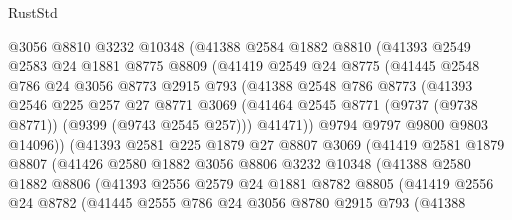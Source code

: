 \begin{lexlean}{RustStd}
\begin{coremodule}
              @3056
              @8810
              @3232
              @10348
              (@41388
                @2584
                @1882
                @8810
                (@41393
                  @2549
                  @2583
                  @24
                  @1881
                  @8775
                  @8809
                  (@41419
                    @2549
                    @24
                    @8775
                    (@41445
                      @2548
                      @786
                      @24
                      @3056
                      @8773
                      @2915
                      @793
                      (@41388
                        @2548
                        @786
                        @8773
                        (@41393
                          @2546
                          @225
                          @257
                          @27
                          @8771
                          @3069
                          (@41464 @2545 @8771 (@9737 (@9738 @8771)) (@9399 (@9743 @2545 @257)))
                          @41471))
                      @9794
                      @9797
                      @9800
                      @9803
                      @14096))
                  (@41393
                    @2581
                    @225
                    @1879
                    @27
                    @8807
                    @3069
                    (@41419
                      @2581
                      @1879
                      @8807
                      (@41426
                        @2580
                        @1882
                        @3056
                        @8806
                        @3232
                        @10348
                        (@41388
                          @2580
                          @1882
                          @8806
                          (@41393
                            @2556
                            @2579
                            @24
                            @1881
                            @8782
                            @8805
                            (@41419
                              @2556
                              @24
                              @8782
                              (@41445
                                @2555
                                @786
                                @24
                                @3056
                                @8780
                                @2915
                                @793
                                (@41388

\end{coremodule}
\end{lexlean}
